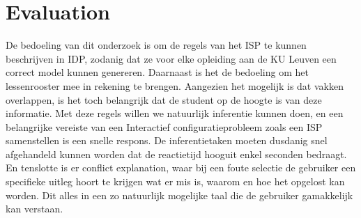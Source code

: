 \chapter{Evaluation}
\label{cha:evaluation}
De bedoeling van dit onderzoek is om de regels van het ISP te kunnen beschrijven in IDP, zodanig dat ze voor elke opleiding aan de KU Leuven een correct model kunnen genereren. Daarnaast is het de bedoeling om het lessenrooster mee in rekening te brengen. Aangezien het mogelijk is dat vakken overlappen, is het toch belangrijk dat de student op de hoogte is van deze informatie. Met deze regels willen we natuurlijk inferentie kunnen doen, en een belangrijke vereiste van een Interactief configuratieprobleem zoals een ISP samenstellen is een snelle respons. De inferentietaken moeten dusdanig snel afgehandeld kunnen worden dat de reactietijd hooguit enkel seconden bedraagt. En tenslotte is er conflict explanation, waar bij een foute selectie de gebruiker een specifieke uitleg hoort te krijgen wat er mis is, waarom en hoe het opgelost kan worden. Dit alles in een zo natuurlijk mogelijke taal die de gebruiker gamakkelijk kan verstaan. 

